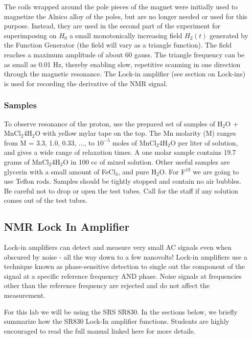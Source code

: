 \documentclass{../lab}
\begin{document}
The coils wrapped around the pole pieces of the magnet were initially used to magnetize the Alnico alloy of the poles, but are no longer needed or used for this purpose. Instead, they are used in the second part of the experiment for superimposing on $H_0$ a small monotonically increasing field $H_2(t)$ generated by the Function Generator (the field will vary as a triangle function). The field reaches a maximum amplitude of about 60 gauss. The triangle frequency can be as small as 0.01 Hz, thereby enabling slow, repetitive scanning in one direction through the magnetic resonance. The Lock-in amplifier (see section on Lock-ins) is used for recording the derivative of the NMR signal.

\subsubsection{Samples}


To observe resonance of the proton, use the prepared set of samples of H$_2$O + MnCl$_2$4H$_2$O with yellow mylar tape on the top. The Mn molarity (M) ranges from M = 3.3, 1.0, 0.33, ..., to $10^{-5}$ moles of MnCl$_2$4H$_2$O per liter of solution, and gives a wide range of relaxation times. A one molar sample contains 19.7 grams of MnCl$_2$4H$_2$O in 100 cc of mixed solution. Other useful samples are glycerin with a small amount of FeCl$_3$, and pure H$_2$O. For F$^{19}$ we are going to use Teflon rods. Samples should be tightly stopped and contain no air bubbles. Be careful not to drop or open the test tubes. Call for the staff if any solution comes out of the test tubes.

\subsection{NMR Lock In Amplifier}
Lock-in amplifiers can detect and measure very small AC signals even when obscured by noise - all the way down to a few nanovolts! Lock-in amplifiers use a technique known as phase-sensitive detection to single out the component of the signal at a specific reference frequency AND phase. Noise signals at frequencies other than the reference frequency are rejected and do not affect the measurement.

For this lab we will be using the SRS SR830. In the sections below, we briefly summarize how the SR830 Lock-In amplifier functions. Students are highly encouraged to read the full manual linked here for more details.
\end{document}
